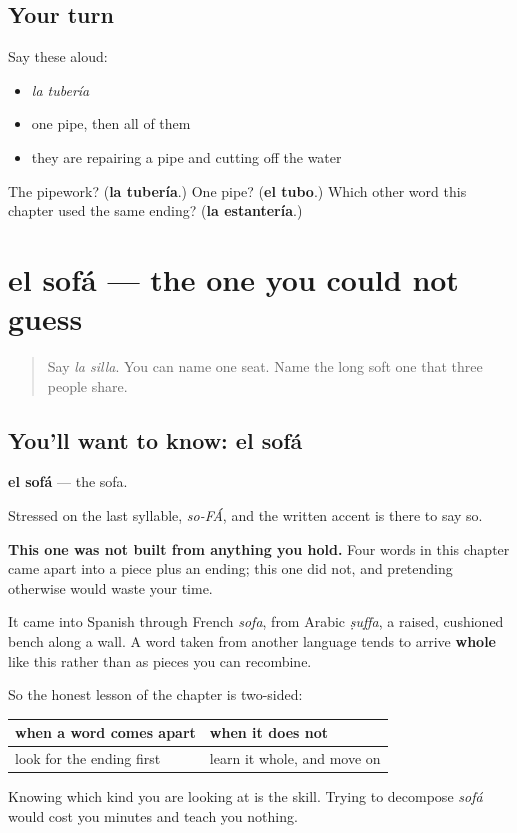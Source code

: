 \subsection*{Your turn}
Say these aloud:

\begin{itemize}
\raggedright
  \item \emph{la tubería}
  \item one pipe, then all of them
  \item they are repairing a pipe and cutting off the water
\end{itemize}

\begin{tcolorbox}[breakable,colback=teal!4,colframe=teal!35!black,title={Before you move on}]
The pipework? (\textbf{la tubería}.) One pipe? (\textbf{el tubo}.) Which other word this chapter used the same ending? (\textbf{la estantería}.)
\end{tcolorbox}
\section[el sofá]{el sofá — the one you could not guess}

\label{lesson:ES-C432-sofa}



\begin{quote}
Say \emph{la silla}. You can name one seat. Name the long soft one that three people share.
\end{quote}

\subsection*{You'll want to know: el sofá}
\textbf{el sofá} — the sofa.

Stressed on the last syllable, \emph{so-FÁ}, and the written accent is there to say so.

\begin{cousinweb}
\textbf{This one was not built from anything you hold.} Four words in this chapter came apart into a piece plus an ending; this one did not, and pretending otherwise would waste your time.

It came into Spanish through French \emph{sofa}, from Arabic \emph{ṣuffa}, a raised, cushioned bench along a wall. A word taken from another language tends to arrive \textbf{whole} like this rather than as pieces you can recombine.

So the honest lesson of the chapter is two-sided:

\noindent
\begin{tabularx}{\linewidth}{@{}>{\raggedright\arraybackslash}X>{\raggedright\arraybackslash}X@{}}
\toprule
\textbf{when a word comes apart} & \textbf{when it does not} \\
\midrule
look for the ending first & learn it whole, and move on \\
\bottomrule
\end{tabularx}

Knowing which kind you are looking at is the skill. Trying to decompose \emph{sofá} would cost you minutes and teach you nothing.
\end{cousinweb}

